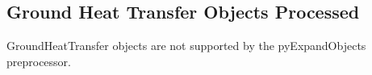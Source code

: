 \subsection{Ground Heat Transfer Objects Processed}\label{pyexpandobjects-ground-heat-transfer-objects-processed}

GroundHeatTransfer objects are not supported by the pyExpandObjects preprocessor.